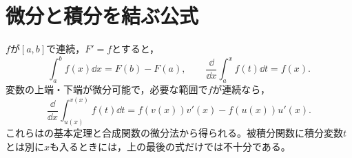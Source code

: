 \section{微分と積分を結ぶ公式}
$f$が$[a,b]$で連続，$F'=f$とすると，
\[
 \int_a^b f(x)\dd x=F(b)-F(a),\qquad
 \frac{\dd}{\dd x}\int_a^x f(t)\dd t=f(x).
\]
変数の上端・下端が微分可能で，必要な範囲で$f$が連続なら，
\[
 \frac{\dd}{\dd x}\int_{u(x)}^{v(x)}f(t)\dd t
 =f(v(x))v'(x)-f(u(x))u'(x).
\]
これらはの基本定理と合成関数の微分法から得られる。被積分関数に積分変数$t$とは別に$x$も入るときには，上の最後の式だけでは不十分である。

